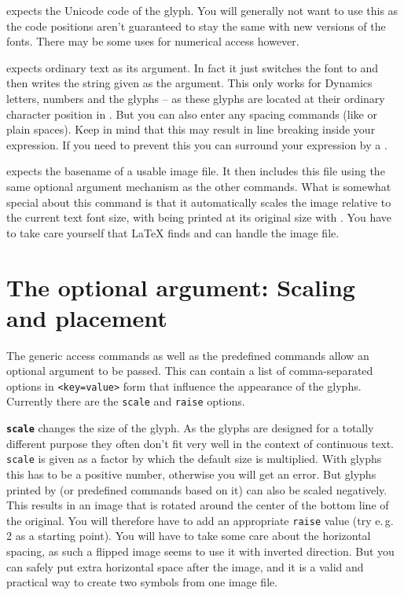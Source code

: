 \documentclass{OLLbook}
\begin{document}
\medskip
{} expects the Unicode code of the glyph. 
You will generally not want to use this as the code positions aren't guaranteed to stay the same with new versions of the fonts. 
There may be some uses for numerical access however.

\medskip
{} expects ordinary text as its argument. 
In fact it just switches the font to \emmentaler and then writes the string given as the argument. 
This only works for Dynamics letters, numbers and the glyphs  -- as these glyphs are located at their ordinary character position in \emmentaler*. 
But you can also enter any spacing commands (like  or plain spaces). 
Keep in mind that this may result in line breaking inside your expression. 
If you need to prevent this you can surround your expression by a .

\medskip
{} expects the basename of a usable image file.
It then includes this file using the same optional argument mechanism as the other commands.
What is somewhat special about this command is that it automatically scales the image relative to the current text font size, with being printed at its original size with .
You have to take care yourself that \LaTeX{} finds and can handle the image file.


\section{The optional argument: Scaling and placement}
\label{sec:optional_argument}
The generic access commands as well as the predefined commands allow an optional argument to be passed.
This can contain a list of comma-separated options in \texttt{<key=value>} form that influence the appearance of the glyphs. Currently there are the \texttt{scale} and \texttt{raise} options.

\medskip
\texttt{\textbf{scale}} changes the size of the glyph. 
As the \emmentaler glyphs are designed for a totally different purpose they often don't fit very well in the context of continuous text.
\texttt{scale} is given as a factor by which the default size is multiplied.
With \emmentaler glyphs this has to be a positive number, otherwise you will get an error.
But glyphs printed by  (or predefined commands based on it) can also be scaled negatively.
This results in an image that is rotated around the center of the bottom line of the original.
You will therefore have to add an appropriate \texttt{raise} value (try e.\,g. 2 as a starting point).
You will have to take some care about the horizontal spacing, as such a flipped image seems to use it with inverted direction.
But you can safely put extra horizontal space after the image, and it is a valid and practical way to create two symbols from one image file.
\end{document}
